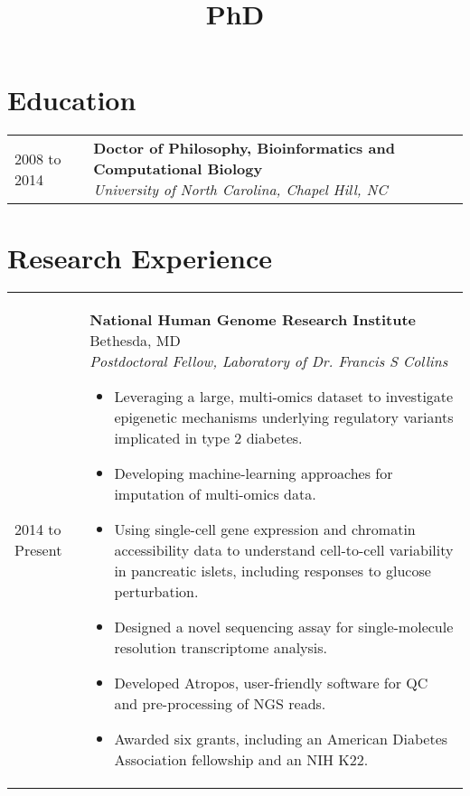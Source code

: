 \documentclass[11pt,letter,sans]{moderncv}
\title{PhD}
\makeatletter
\newenvironment{entrylistThree}{%
  \begin{tabular*}{\textwidth}{@{\extracolsep{\fill}}ll}
}{%
  \end{tabular*}
}
\newcommand{\entryThree}[3]{%
  #1&\parbox[t]{140mm}{%
    \textbf{#2}\\%
    \textit{#3}\vspace{\parsep}%
  }\\}
\newenvironment{entrylistFive}{%
  \begin{tabular*}{\textwidth}{@{\extracolsep{\fill}}ll}
}{%
  \end{tabular*}
}
\newcommand{\entryFive}[5]{%
  #1&\parbox[t]{140mm}{%
    \textbf{#2}%
    \hfill%
    {\footnotesize #3}\\%
	\emph{#4}\\%
    #5\vspace{\parsep}%
  }\\}
\makeatother
\begin{document}
\makecvtitle

\section{Education}
\begin{entrylistThree}
\entryThree
{2008 to 2014}
{Doctor of Philosophy, Bioinformatics and Computational Biology}
{University of North Carolina, Chapel Hill, NC}
\entryThree
{1996 to 2001}
{Bachelor of Science, Computer Science}
{Northwestern University, Evanston, IL}
\end{entrylistThree}


\section{Research Experience}
\begin{entrylistFive}
\entryFive
{2014 to Present}
{National Human Genome Research Institute}
{Bethesda, MD}
{Postdoctoral Fellow, Laboratory of Dr. Francis S Collins}
{\vspace{-5mm}
\begin{itemize}
\item {Leveraging a large, multi-omics dataset to investigate epigenetic mechanisms underlying regulatory variants implicated in type 2 diabetes.}
\item {Developing machine-learning approaches for imputation of multi-omics data.}
\item {Using single-cell gene expression and chromatin accessibility data to understand cell-to-cell variability in pancreatic islets, including responses to glucose perturbation.}
\item {Designed a novel sequencing assay for single-molecule resolution transcriptome analysis.}
\item {Developed Atropos, user-friendly software for QC and pre-processing of NGS reads.}
\item {Awarded six grants, including an American Diabetes Association fellowship and an NIH K22.}
\end{itemize}
}
\entryFive
{2009 to 2014}
{University of North Carolina at Chapel Hill}
{Chapel Hill, NC}
{Research Assistant, Laboratory of Dr. Fernando Pardo-Manuel de Villena}
{\vspace{-5mm}
\begin{itemize}
\item {Characterized a novel meiotic drive locus, \textit{R2d2}, and multiple modifier loci responsible for extreme transmission distortion in interspecific crosses.}
\item {Conducted a GWAS of wild mice to identify genes associated with the accumulation of Robertsonian translocations.}
\item {Developed CLASP, a software tool for validation of cell lines used in research.}
\end{itemize}
}
\entryFive
{2007 to 2008}
{Institute for Systems Biology}
{Seattle, WA}
{Computational Biology Software Engineer, Laboratory of Dr. Ruedi Aebersold}
{Created TIQAM, a work flow management system to support Multiple Reaction Monitoring (MRM) proteomics experiments.}
\end{entrylistFive}
\end{document}
